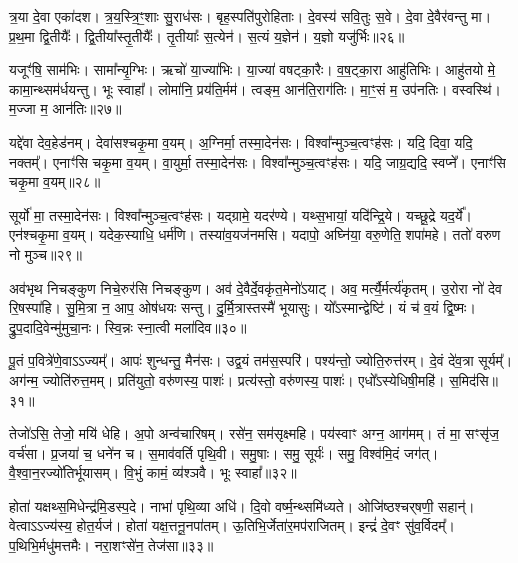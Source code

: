 त्र॒या दे॒वा एका॑दश।
त्र॒य॒स्त्रि॒ꣳ॒शाः सु॒राध॑सः।
बृह॒स्पति॑पुरो\-हिताः।
दे॒वस्य॑ सवि॒तुः स॒वे।
दे॒वा दे॒वैर॑वन्तु मा।
प्र॒थ॒मा द्वि॒तीयैः᳚।
द्वि॒तीया᳚स्तृ॒तीयैः᳚।
तृ॒तीयाः᳚ स॒त्येन॑।
स॒त्यं य॒ज्ञेन॑।
य॒ज्ञो यजु॑र्भिः॥२६॥\ip

यजूꣳ॑षि॒ साम॑भिः।
सामा᳚न्यृ॒ग्भिः।
ऋचो॑ या॒ज्या॑भिः।
या॒ज्या॑ वषट्का॒रैः।
व॒ष॒ट्का॒रा आहु॑तिभिः।
आहु॑तयो मे॒ कामा॒न्थ्सम॑र्धयन्तु।
भूः स्वाहा᳚।
लोमा॑नि॒ प्रय॑ति॒र्मम॑।
त्वङ्म॒ आन॑ति॒राग॑तिः।
मा॒ꣳ॒सं म॒ उप॑नतिः।
वस्वस्थि॑।
म॒ज्जा म॒ आन॑तिः॥२७॥\ip\anuvakamend[प॒स्त्या᳚स्वा सर॑स्वत्यै॒ भैष॑ज्येन॒ श्रीरङ्गा॑नि भ॒सद्य॒ज्ञे य॒ज्ञो यजु॑र्भि॒रुप॑नति॒र्द्वे च॑]

यद्दे॑वा देव॒हेड॑नम्।
देवा॑सश्चकृ॒मा व॒यम्।
अ॒ग्निर्मा॒ तस्मा॒देन॑सः।
विश्वा᳚न्मुञ्च॒त्वꣳह॑सः।
यदि॒ दिवा॒ यदि॒ नक्तम्᳚।
एनाꣳ॑सि चकृ॒मा व॒यम्।
वा॒युर्मा॒ तस्मा॒देन॑सः।
विश्वा᳚न्मुञ्च॒त्वꣳह॑सः।
यदि॒ जाग्र॒द्यदि॒ स्वप्ने᳚।
एनाꣳ॑सि चकृ॒मा व॒यम्॥२८॥\ip

सूर्यो॑ मा॒ तस्मा॒देन॑सः।
विश्वा᳚न्मुञ्च॒त्वꣳह॑सः।
यद्ग्रामे॒ यदर॑ण्ये।
यथ्स॒भायां॒ यदि॑न्द्रि॒ये।
यच्छू॒द्रे यद॒र्ये᳚।
एन॑श्चकृ॒मा व॒यम्।
यदेक॒स्याधि॒ धर्म॑णि।
तस्या॑व॒यज॑नमसि।
यदापो॒ अघ्नि॑या॒ वरु॒णेति॒ शपा॑महे।
ततो॑ वरुण नो मुञ्च॥२९॥\ip

अव॑भृथ निचङ्कुण निचे॒रुर॑सि निचङ्कुण।
अव॑ दे॒वैर्दे॒वकृ॑त॒मेनो॑\-ऽयाट्।
अव॒ मर्त्यै॒र्मर्त्य॑कृतम्।
उ॒रोरा नो॑ देव रि॒षस्पा॑हि।
सु॒मि॒त्रा न॒ आप॒ ओष॑धयः सन्तु।
दु॒र्मि॒त्रास्तस्मै॑ भूयासुः।
यो᳚ऽस्मान्द्वेष्टि॑।
यं च॑ व॒यं द्वि॒ष्मः।
द्रु॒प॒दादि॒वेन्मु॑मुचा॒नः।
स्वि॒न्नः स्ना॒त्वी मला॑दिव॥३०॥\ip

पू॒तं प॒वित्रे॑णे॒वाऽऽज्यम्᳚।
आपः॑ शुन्धन्तु॒ मैन॑सः।
उद्व॒यं तम॑स॒स्परि॑।
पश्य॑न्तो॒ ज्योति॒रुत्त॑रम्।
दे॒वं दे॑व॒त्रा सूर्यम्᳚।
अग॑न्म॒ ज्योति॑रुत्त॒मम्।
प्रति॑\-युतो॒ वरु॑णस्य॒ पाशः॑।
प्रत्य॑स्तो॒ वरु॑णस्य॒ पाशः॑।
एधो᳚ऽस्येधिषी॒महि॑।
स॒मिद॑सि॥३१॥\ip

तेजो॑ऽसि॒ तेजो॒ मयि॑ धेहि।
अ॒पो अन्व॑चारिषम्।
रसे॑न॒ सम॑सृक्ष्महि।
पय॑स्वाꣳ अग्न॒ आग॑मम्।
तं मा॒ सꣳसृ॑ज॒ वर्च॑सा।
प्र॒जया॑ च॒ धने॑न च।
स॒माव॑वर्ति पृथि॒वी।
समु॒षाः।
समु॒ सूर्यः॑।
समु॒ विश्व॑मि॒दं जग॑त्।
वै॒श्वा॒न॒रज्यो॑तिर्भूयासम्।
वि॒भुं कामं॒ व्य॑श्ञवै।
भूः स्वाहा᳚॥३२॥\ip\anuvakamend[स्वप्न॒ एनाꣳ॑सि चकृ॒मा व॒यं मु॑ञ्च॒ मला॑दिव स॒मिद॑सि॒ जग॒त्रीणि॑ च]

होता॑ यक्षथ्स॒मिधेन्द्र॑मि॒डस्प॒दे।
नाभा॑ पृथि॒व्या अधि॑।
दि॒वो वर्ष्म॒न्थ्समि॑ध्यते।
ओजि॑ष्ठश्चर्‌\mbox{}षणी॒ सहान्॑।
वेत्वा\-ऽ\-ऽ\-ज्य॑स्य॒ होत॒र्यज॑।
होता॑ यक्ष॒त्तनू॒नपा॑तम्।
ऊ॒तिभि॒र्जेता॑र॒\-मप॑\-राजितम्।
इन्द्रं॑ दे॒वꣳ सु॑व॒र्विदम्᳚।
प॒थिभि॒र्मधु॑मत्तमैः।
नरा॒शꣳसे॑न॒ तेज॑सा॥३३॥\ip

